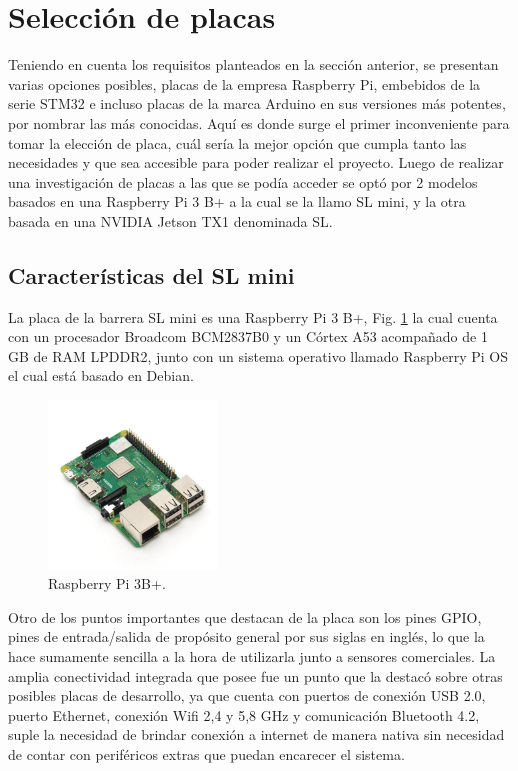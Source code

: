 \section{Selección de placas}

Teniendo en cuenta los requisitos planteados en la sección anterior, se presentan varias opciones posibles,
placas de la empresa Raspberry Pi, embebidos de la serie STM32 e incluso placas de la marca Arduino en sus versiones más potentes, por nombrar las más conocidas.
Aquí es donde surge el primer inconveniente para tomar la elección de placa,
cuál sería la mejor opción que cumpla tanto las necesidades y que sea accesible para poder realizar el proyecto.
Luego de realizar una investigación de placas a las que se podía acceder se optó por 2 modelos basados en una Raspberry Pi 3 B+ a la cual se la llamo SL mini, y la otra basada en una NVIDIA Jetson TX1 denominada SL.

\subsection{Características del SL mini}

La placa de la barrera SL mini es una Raspberry Pi 3 B+, Fig. \ref{fig:raspberry} la cual cuenta con un procesador
Broadcom BCM2837B0 y un Córtex A53 acompañado de 1 GB de RAM LPDDR2, junto con un sistema operativo llamado Raspberry Pi OS el cual está basado en Debian.

\begin{figure}
    \centering
    \includegraphics[width=0.4\textwidth]{imgs/Raspberry-pi3b+.jpg}
    \caption{Raspberry Pi 3B+.}
    \label{fig:raspberry}
\end{figure}

Otro de los puntos importantes que destacan de la placa son los pines GPIO, pines de entrada/salida de propósito general por sus siglas en inglés, lo que la hace sumamente sencilla a la hora de utilizarla junto a sensores comerciales.
La amplia conectividad integrada que posee fue un punto que la destacó sobre otras posibles placas de desarrollo, ya que cuenta con puertos de conexión USB 2.0, puerto Ethernet, conexión Wifi 2,4 y 5,8 GHz y comunicación Bluetooth 4.2, suple la necesidad de brindar conexión a internet de manera nativa sin necesidad de contar con periféricos extras que puedan encarecer el sistema.

